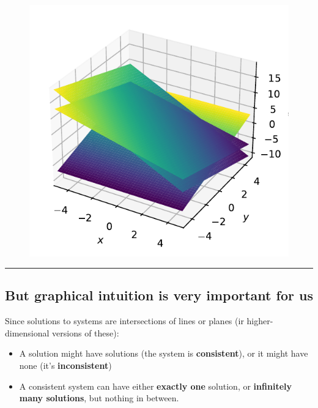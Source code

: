 \documentclass[
  letterpaper,
  DIV=11,
  numbers=noendperiod]{scrartcl}
\providecommand{\tightlist}{%
  \setlength{\itemsep}{0pt}\setlength{\parskip}{0pt}}\usepackage{longtable,booktabs,array}
\begin{document}
\begin{figure}[H]

{\centering \includegraphics{302-linearsystems_files/figure-pdf/cell-3-output-1.pdf}

}

\end{figure}

\begin{center}\rule{0.5\linewidth}{0.5pt}\end{center}

\hypertarget{but-graphical-intuition-is-very-important-for-us}{%
\subsection{But graphical intuition is very important for
us}\label{but-graphical-intuition-is-very-important-for-us}}

Since solutions to systems are intersections of lines or planes (ir
higher-dimensional versions of these):

\begin{itemize}
\tightlist
\item
  A solution might have solutions (the system is \textbf{consistent}),
  or it might have none (it's \textbf{inconsistent})
\item
  A consistent system can have either \textbf{exactly one} solution, or
  \textbf{infinitely many solutions}, but nothing in between.
\end{itemize}
\end{document}
